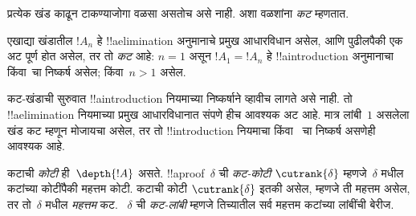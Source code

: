 \documentclass[../../../include/open-logic-section]{subfiles}
\begin{document}
प्रत्येक खंड काढून
टाकण्याजोगा वळसा
असतोच असे नाही.
अशा वळशांना
\emph{कट} म्हणतात.

\begin{defn}
एखाद्या खंडातील
$!A_n$ हे
!!a{elimination} अनुमानाचे
प्रमुख आधारविधान असेल,
आणि पुढीलपैकी एक
अट पूर्ण होत असेल,
तर तो \emph{कट} आहे:
$n=1$ असून
$!A_1 = !A_n$ हे
!!a{introduction} अनुमानाचा
किंवा~\FalseInt चा
निष्कर्ष असेल;
किंवा~$n>1$ असेल.
\end{defn}

कट-खंडाची सुरुवात
!!a{introduction} नियमाच्या
निष्कर्षाने व्हावीच
लागते असे नाही.
तो !!a{elimination}
नियमाच्या प्रमुख
आधारविधानात संपणे
हीच आवश्यक अट आहे.
मात्र लांबी~$1$
असलेला खंड कट
म्हणून मोजायचा असेल,
तर तो !!{introduction}
नियमाचा किंवा~\FalseInt
चा निष्कर्ष असणेही
आवश्यक आहे.

\begin{defn}
कटाची \emph{कोटी}
ही~$\depth{!A}$
असते. !!a{proof}~$\delta$
ची \emph{कट-कोटी}
$\cutrank{\delta}$
म्हणजे~$\delta$
मधील कटांच्या
कोटींपैकी महत्तम कोटी.
कटाची कोटी
$\cutrank{\delta}$
इतकी असेल, म्हणजे
ती महत्तम असेल,
तर तो~$\delta$
मधील \emph{महत्तम} कट.
~$\delta$ ची
\emph{कट-लांबी}
म्हणजे तिच्यातील
सर्व महत्तम कटांच्या
लांबींची बेरीज.
\end{defn}
\end{document}
